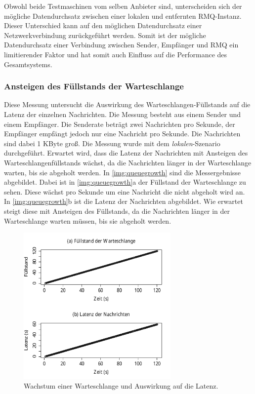 Obwohl beide Testmaschinen vom selben Anbieter sind, unterscheiden sich der mögliche Datendurchsatz zwischen einer lokalen und entfernten RMQ-Instanz. Dieser Unterschied kann auf den möglichen Datendurchsatz einer Netzwerkverbindung zurückgeführt werden. Somit ist der mögliche Datendurchsatz einer Verbindung zwischen Sender, Empfänger und RMQ ein limitierender Faktor und hat somit auch Einfluss auf die Performance des Gesamtsystems.

\subsubsection{Ansteigen des Füllstands der Warteschlange}
\label{sec:queueGrowth}
Diese Messung untersucht die Auswirkung des Warteschlangen-Füllstands auf die Latenz der einzelnen Nachrichten. Die Messung besteht aus einem Sender und einem Empfänger. Die Senderate beträgt zwei Nachrichten pro Sekunde, der Empfänger empfängt jedoch nur eine Nachricht pro Sekunde. Die Nachrichten sind dabei 1 KByte groß. Die Messung wurde mit dem \textit{lokalen}-Szenario durchgeführt. Erwartet wird, dass die Latenz der Nachrichten mit Ansteigen des Warteschlangenfüllstands wächst, da die Nachrichten länger in der Warteschlange warten, bis sie abgeholt werden.
In \autoref{img:queuegrowth} sind die Messergebnisse abgebildet. Dabei ist in \autoref{img:queuegrowth}a der Füllstand der Warteschlange zu sehen. Diese wächst pro Sekunde um eine Nachricht die nicht abgeholt wird an. In \autoref{img:queuegrowth}b ist die Latenz der Nachrichten abgebildet. Wie erwartet steigt diese mit Ansteigen des Füllstands, da die Nachrichten länger in der Warteschlange warten müssen, bis sie abgeholt werden.
\begin{figure}
\center
  \includegraphics[width=0.7\textwidth]{images/measurement/queuegrowth.pdf}
  \caption{Wachstum einer Warteschlange und Auswirkung auf die Latenz.}
  \label{img:queuegrowth}
\end{figure}

